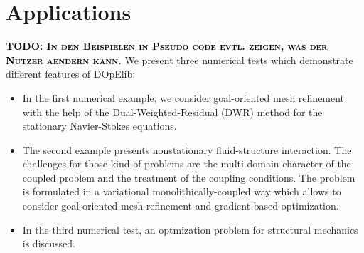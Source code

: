 \documentclass[prodmode,acmtoms]{acmsmall}
\numberwithin{equation}{section}
\newcommand{\todo}[1]{\textbf{\textsc{\textcolor{black}{TODO: #1}}}}
\begin{document}
%
%
%
%
%
\section{Applications}
\label{applications}
\todo{In den Beispielen in Pseudo code evtl. zeigen, was der 
Nutzer aendern kann.}
We present three numerical tests which demonstrate different
features of DOpElib:
\begin{itemize}
\item In the first numerical example, we consider 
goal-oriented mesh refinement with the help of the 
Dual-Weighted-Residual (DWR) method for the stationary Navier-Stokes equations.
\item The second example presents nonstationary fluid-structure 
interaction. The challenges for those kind of problems are the multi-domain
character of the coupled problem and the treatment of the coupling conditions.
The problem is formulated in a variational monolithically-coupled way which 
allows to consider goal-oriented mesh refinement and gradient-based optimization.
\item In the third numerical test, an optmization problem for structural mechanics
is discussed.
\end{itemize}
\end{document}
